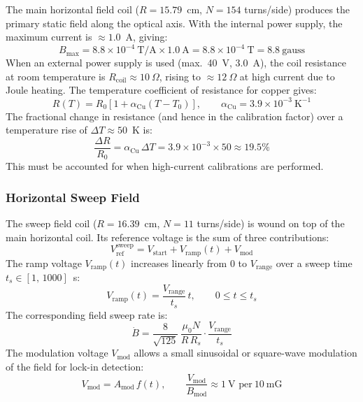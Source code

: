 The main horizontal field coil ($R = 15.79$~cm, $N = 154$ turns/side) produces the
primary static field along the optical axis. With the internal power supply, the maximum
current is $\approx 1.0$~A, giving:
\begin{equation}
    B_{\text{max}} = 8.8\times10^{-4}\ \text{T/A} \times 1.0\ \text{A}
                   = 8.8\times10^{-4}\ \text{T} = 8.8\ \text{gauss}
\end{equation}
When an external power supply is used (max.\ 40~V, 3.0~A), the coil resistance at room
temperature is $R_{\text{coil}} \approx 10\ \Omega$, rising to $\approx 12\ \Omega$ at
high current due to Joule heating. The temperature coefficient of resistance for copper
gives:
\begin{equation}
    R(T) = R_0\left[1 + \alpha_{\text{Cu}}(T - T_0)\right],
    \qquad \alpha_{\text{Cu}} = 3.9\times10^{-3}\ \text{K}^{-1}
\end{equation}
The fractional change in resistance (and hence in the calibration factor) over a
temperature rise of $\Delta T \approx 50$~K is:
\begin{equation}
    \frac{\Delta R}{R_0} = \alpha_{\text{Cu}}\,\Delta T
    = 3.9\times10^{-3} \times 50 \approx 19.5\%
\end{equation}
This must be accounted for when high-current calibrations are performed.
 
\subsubsection*{Horizontal Sweep Field}
 
The sweep field coil ($R = 16.39$~cm, $N = 11$ turns/side) is wound on top of the
main horizontal coil. Its reference voltage is the sum of three contributions:
\begin{equation}
    V_{\text{ref}}^{\text{sweep}} = V_{\text{start}} + V_{\text{ramp}}(t) + V_{\text{mod}}
\end{equation}
The ramp voltage $V_{\text{ramp}}(t)$ increases linearly from 0 to $V_{\text{range}}$
over a sweep time $t_s \in [1,\,1000]$~s:
\begin{equation}
    V_{\text{ramp}}(t) = \frac{V_{\text{range}}}{t_s}\,t, \qquad 0 \leq t \leq t_s
\end{equation}
The corresponding field sweep rate is:
\begin{equation}
    \dot{B} = \frac{8}{\sqrt{125}}\,\frac{\mu_0 N}{R\,R_s}\cdot
              \frac{V_{\text{range}}}{t_s}
\end{equation}
The modulation voltage $V_{\text{mod}}$ allows a small sinusoidal or square-wave
modulation of the field for lock-in detection:
\begin{equation}
    V_{\text{mod}} = A_{\text{mod}}\,f(t), \qquad
    \frac{V_{\text{mod}}}{B_{\text{mod}}} \approx 1\ \text{V per}\ 10\ \text{mG}
\end{equation}
 
